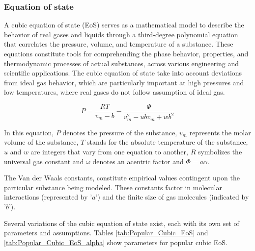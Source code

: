 \documentclass[../Article_Model_Parameters.tex]{subfiles}
\begin{document}
	
	\label{CH: Thermodynamic_details}
	
	\subsubsection{Equation of state} \label{subsubsec: Equation of state}
	
	A cubic equation of state (EoS) serves as a mathematical model to describe the behavior of real gases and liquids through a third-degree polynomial equation that correlates the pressure, volume, and temperature of a substance. These equations constitute tools for comprehending the phase behavior, properties, and thermodynamic processes of actual substances, across various engineering and scientific applications. The cubic equation of state take into account deviations from ideal gas behavior, which are particularly important at high pressures and low temperatures, where real gases do not follow assumption of ideal gas.
	
	{\footnotesize
	\begin{equation}
		P = \frac{RT}{v_m-b} - \frac{\Phi}{v_m^2 - ubv_m + wb^2}
	\end{equation}
	}
	
	In this equation, $P$ denotes the pressure of the substance, $v_m$ represents the molar volume of the substance, $T$ stands for the absolute temperature of the substance, $u$ and $w$ are integers that vary from one equation to another, $R$ symbolizes the universal gas constant and $\omega$ denotes an acentric factor and $\Phi=a\alpha$.
	
	The Van der Waals constants, constitute empirical values contingent upon the particular substance being modeled. These constants factor in molecular interactions (represented by '$a$') and the finite size of gas molecules (indicated by '$b$'). 
	
	Several variations of the cubic equation of state exist, each with its own set of parameters and assumptions. Tables \ref{tab:Popular_Cubic_EoS} and \ref{tab:Popular_Cubic_EoS_alpha} show parameters for popular cubic EoS.
	
	\begin{table}[h!]
		\centering
		\caption{Parameters for Popular Cubic EoS}
		\label{tab:Popular_Cubic_EoS}
	\end{table}
	
\end{document}
